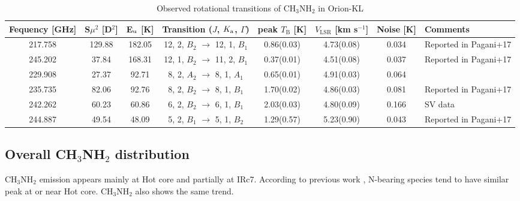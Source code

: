 \renewcommand{\arraystretch}{1.5}
\begin{table}[htb]
\begin{center}

  \caption{Observed rotational transitions of CH$_3$NH$_2$ in Orion-KL}
  \label{tab:MAOri}
{\scriptsize
  \begin{tabular}{cccccccl} \hline
   Fequency [GHz]& S$\mu ^{2}$ [D$^2$] & E$_{\rm{u}}$ [K]& Transition ($J$, $K_{\rm{a}}$, $\Gamma$) & peak $T_{\mathrm{B}}$ [K] & $V_{\mathrm{LSR}}$ [km s$^{-1}$] & Noise [K]  &Comments \\ \hline 
    217.758 & 129.88 & 182.05 & 12, 2, $B_{2}$ $\rightarrow$ 12, 1, $B_{1}$ & 0.86(0.03) & 4.73(0.08) & 0.034 &Reported in Pagani+17 \\
    245.202 & 37.84 & 168.31 & 12, 1, $B_{2}$ $\rightarrow$ 11, 2, $B_{1}$ & 0.37(0.01) & 4.51(0.08) & 0.037 &Reported in Pagani+17 \\
    229.908 & 27.37 & 92.71 & 8, 2, $A_{2}$ $\rightarrow$ 8, 1, $A_{1}$ & 0.65(0.01) & 4.91(0.03) & 0.064&\\ 
    235.735 & 82.06 & 92.76 & 8, 2, $B_{2}$ $\rightarrow$ 8, 1, $B_{1}$ & 1.70(0.02) & 4.86(0.03) & 0.081 &Reported in Pagani+17 \\
    242.262 & 60.23 & 60.86 & 6, 2, $B_{2}$ $\rightarrow$ 6, 1, $B_{1}$ & 2.03(0.03) & 4.80(0.09) & 0.166 &SV data \\
    244.887 & 49.54 & 48.09 & 5, 2, $B_{1}$ $\rightarrow$ 5, 1, $B_{2}$ & 1.29(0.57)& 5.23(0.90) & 0.043 &Reported in Pagani+17 \\ \hline
  \end{tabular}
  }
\end{center}
\end{table}

\subsection{Overall CH$_3$NH$_2$ distribution}
CH$_3$NH$_2$ emission appears mainly at Hot core and partially at IRc7.
According to previous work \citep[see e.g.,][]{Feng+2015, Gong+2015}, N-bearing species tend to have 
similar peak at or near Hot core.  CH$_3$NH$_2$ also shows the same trend.

